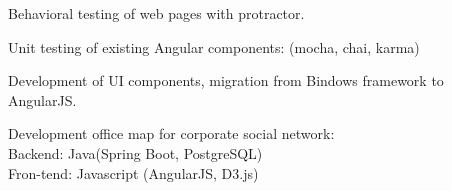 \begin{cventries}
{\begin{cvitems}
    \item {Behavioral testing of web pages with protractor.}
    \item {Unit testing of existing Angular components: (mocha, chai, karma)}
    \item {Development of UI components, migration from Bindows framework to AngularJS.}
    \item{ Development office map for corporate social network:
    \\ Backend: Java(Spring Boot, PostgreSQL)
    \\ Fron-tend: Javascript (AngularJS, D3.js)
    }
  \end{cvitems}
  }
\end{cventries}
